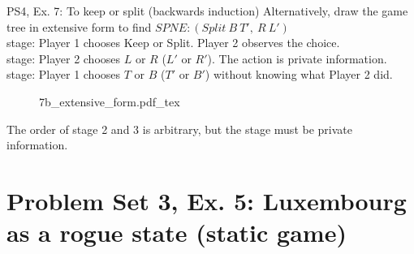 \begin{frame}{PS4, Ex. 7: To keep or split (backwards induction)}
  Alternatively, draw the game tree in extensive form to find $SPNE:(Split\ B\ T',\ R\ L')$\\\medskip
   stage: Player 1 chooses Keep or Split. Player 2 observes the choice.\\\medskip
   stage: Player 2 chooses $L$ or $R$ ($L'$ or $R'$). The action is private information.\\\medskip
   stage: Player 1 chooses $T$ or $B$ ($T'$ or $B'$) without knowing what Player 2 did.\\\medskip
  \begin{figure}[!h]
    \begin{center}
    \def\svgwidth{\columnwidth}
    {7b_extensive_form.pdf_tex}
    \end{center}
  \end{figure}
  \vspace{-8pt}
  The order of stage 2 and 3 is arbitrary, but the  stage must be private information.
\end{frame}


\section{Problem Set 3, Ex. 5: Luxembourg as a rogue state (static game)}

